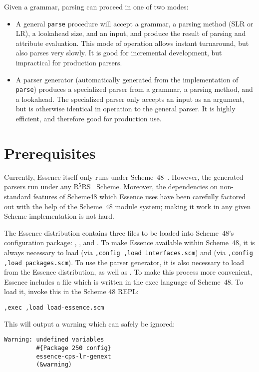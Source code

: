 \documentclass{article}
\newcommand{\codefont}[1]{\texttt{#1}}
\begin{document}
Given a grammar, parsing can proceed in one of two modes:
%
\begin{itemize}
\item A general \codefont{parse} procedure will accept a grammar, a
  parsing method (SLR or LR), a lookahead size, and an input, and
  produce the result of parsing and attribute evaluation.  This mode
  of operation allows instant turnaround, but also parses very
  slowly.  It is good for incremental development, but impractical for
  production parsers.
\item A parser generator (automatically generated from the
  implementation of \codefont{parse}) produces a specialized parser
  from a grammar, a parsing method, and a lookahead.  The specialized
  parser only accepts an input as an argument, but is otherwise
  identical in operation to the general parser.  It is highly
  efficient, and therefore good for production use.
\end{itemize}

\section{Prerequisites}
\label{sec:preliminaries}

Currently, Essence itself only runs under
Scheme~48~\cite{KelseyRees1995}.  However, the generated parsers run
under any R$^5$RS~\cite{KelseyClingerRees1998} Scheme.  Moreover, the
dependencies on non-standard features of Scheme48 which Essence uses
have been carefully factored out with the help of the Scheme~48 module
system; making it work in any given Scheme implementation is not hard.

The Essence distribution contains three files to be loaded into
Scheme~48's configuration package: ,
, and .  To
make Essence available within Scheme~48, it is always necessary to
load  (via \codefont{,config ,load
  interfaces.scm}) and 
(via \codefont{,config ,load
  packages.scm}).  To use the parser generator, it is also necessary
to load  from the Essence
distribution, as well as .
To make this process more convenient, Essence includes a file
 which is written in the exec language of
Scheme~48.  To load it, invoke this in the Scheme 48 REPL:
%
\begin{verbatim}
,exec ,load load-essence.scm
\end{verbatim}
%
This will output a warning which can safely be ignored:
%
\begin{verbatim}
Warning: undefined variables
         #{Package 250 config}
         essence-cps-lr-genext
         (&warning)
\end{verbatim}
\end{document}
